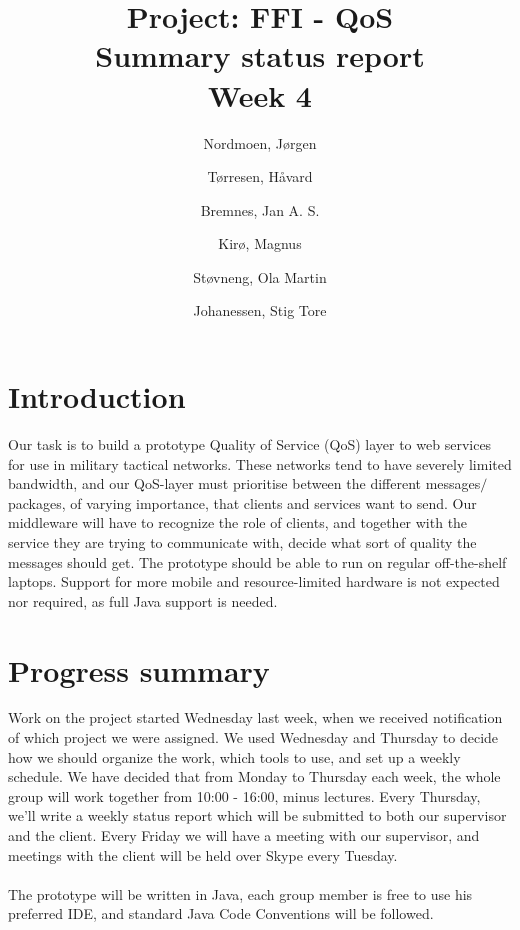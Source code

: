 \documentclass[titlepage]{article}
\title{Project: FFI - QoS \\ Summary status report \\ Week 4}
\author{Nordmoen, Jørgen \and Tørresen, Håvard \and Bremnes, Jan A. S.  \and Kirø, Magnus  \and Støvneng, Ola Martin  \and Johanessen, Stig Tore}
\begin{document}
    \maketitle
    \newpage
      
    \section*{Introduction}
        Our task is to build a prototype Quality of Service (QoS) layer to web services for use in military tactical networks. These networks tend to have severely limited bandwidth, and our QoS-layer must prioritise between the different messages$/$packages, of varying importance, that clients and services want to send. Our middleware will have to recognize the role of clients, and together with the service they are trying to communicate with, decide what sort of quality the messages should get.
The prototype should be able to run on regular off-the-shelf laptops. Support for more mobile and resource-limited hardware is not expected nor required, as full Java support is needed.

    \section*{Progress summary}
        Work on the project started Wednesday last week, when we received notification of which project we were assigned. We used Wednesday and Thursday to decide how we should organize the work, which tools to use, and set up a weekly schedule.
We have decided that from Monday to Thursday each week, the whole group will work together from 10:00 - 16:00, minus lectures. Every Thursday, we'll write a weekly status report which will be submitted to both our supervisor and the client. Every Friday we will have a meeting with our supervisor, and meetings with the client will be held over Skype every Tuesday.
\\\\
        The prototype will be written in Java, each group member is free to use his preferred IDE, and standard Java Code Conventions will be followed. 
\end{document}
